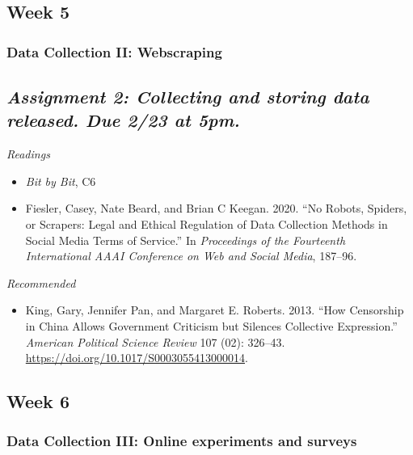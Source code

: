 \documentclass[
  10pt,
]{article}
\providecommand{\tightlist}{%
  \setlength{\itemsep}{0pt}\setlength{\parskip}{0pt}}
\begin{document}
\hypertarget{week-5}{%
\subsection{Week 5}\label{week-5}}

\hypertarget{data-collection-ii-webscraping}{%
\subsubsection{Data Collection II:
Webscraping}\label{data-collection-ii-webscraping}}

\hypertarget{assignment-2-collecting-and-storing-data-released.-due-223-at-5pm.}{%
\subsection{\texorpdfstring{\emph{Assignment 2: Collecting and storing
data released. Due 2/23 at
5pm.}}{Assignment 2: Collecting and storing data released. Due 2/23 at 5pm.}}\label{assignment-2-collecting-and-storing-data-released.-due-223-at-5pm.}}

\emph{Readings}

\begin{itemize}
\tightlist
\item
  \emph{Bit by Bit}, C6
\item
  Fiesler, Casey, Nate Beard, and Brian C Keegan. 2020. ``No Robots,
  Spiders, or Scrapers: Legal and Ethical Regulation of Data Collection
  Methods in Social Media Terms of Service.'' In \emph{Proceedings of
  the Fourteenth International AAAI Conference on Web and Social Media},
  187--96.
\end{itemize}

\emph{Recommended}

\begin{itemize}
\tightlist
\item
  King, Gary, Jennifer Pan, and Margaret E. Roberts. 2013. ``How
  Censorship in China Allows Government Criticism but Silences
  Collective Expression.'' \emph{American Political Science Review} 107
  (02): 326--43. \url{https://doi.org/10.1017/S0003055413000014}.
\end{itemize}

\hypertarget{week-6}{%
\subsection{Week 6}\label{week-6}}

\hypertarget{data-collection-iii-online-experiments-and-surveys}{%
\subsubsection{Data Collection III: Online experiments and
surveys}\label{data-collection-iii-online-experiments-and-surveys}}
\end{document}
